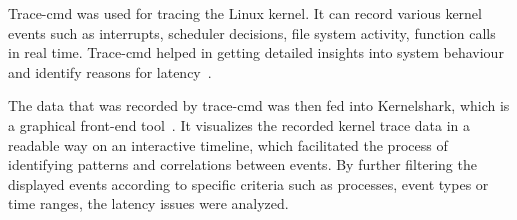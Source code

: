 \documentclass[MMR,Master,english]{twbook}
\begin{document}

\bigskip \noindent Trace-cmd was used for tracing the Linux kernel. It can record various kernel events such as interrupts, scheduler decisions, file system activity, function calls in real time. Trace-cmd helped in getting detailed insights into system behaviour and identify reasons for latency~\cite{Tracecmd}.

\bigskip \noindent The data that was recorded by trace-cmd was then fed into Kernelshark, which is a graphical front-end tool~\cite{KernelShark}. It visualizes the recorded kernel trace data in a readable way on an interactive timeline, which facilitated the process of identifying patterns and correlations between events. By further filtering the displayed events according to specific criteria such as processes, event types or time ranges, the latency issues were analyzed.
\end{document}
